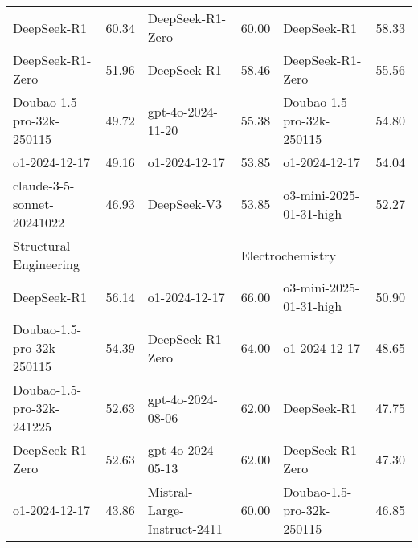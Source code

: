 {\begin{longtable}{p{4.2cm}>{\centering\arraybackslash} p{0.8cm}|p{4.2cm} >{\centering\arraybackslash} p{0.8cm}|p{4.2cm} >{\centering\arraybackslash} p{0.8cm}}
\hline
\cellcolor{blue!5} DeepSeek-R1 & \cellcolor{blue!2}60.34 & \cellcolor{red!5} DeepSeek-R1-Zero & \cellcolor{red!2} 60.00 & \cellcolor{green!5} DeepSeek-R1 & \cellcolor{green!2} 58.33\\
\cellcolor{blue!5} DeepSeek-R1-Zero & \cellcolor{blue!2}51.96 & \cellcolor{red!5} DeepSeek-R1 & \cellcolor{red!2} 58.46 & \cellcolor{green!5} DeepSeek-R1-Zero & \cellcolor{green!2} 55.56\\
\cellcolor{blue!5} Doubao-1.5-pro-32k-250115 & \cellcolor{blue!2}49.72 & \cellcolor{red!5} gpt-4o-2024-11-20 & \cellcolor{red!2} 55.38 & \cellcolor{green!5} Doubao-1.5-pro-32k-250115 & \cellcolor{green!2} 54.80\\
\cellcolor{blue!5} o1-2024-12-17 & \cellcolor{blue!2}49.16 & \cellcolor{red!5} o1-2024-12-17 & \cellcolor{red!2} 53.85 & \cellcolor{green!5} o1-2024-12-17 & \cellcolor{green!2} 54.04\\
\cellcolor{blue!5} claude-3-5-sonnet-20241022 & \cellcolor{blue!2}46.93 & \cellcolor{red!5} DeepSeek-V3 & \cellcolor{red!2} 53.85 & \cellcolor{green!5} o3-mini-2025-01-31-high & \cellcolor{green!2} 52.27\\
\hline
\multicolumn{2}{p{5.15cm}|}{\cellcolor{blue!10} \centering Structural Engineering} & \multicolumn{2}{p{5.15cm}|}{\cellcolor{purple!10} \centering Broadcasting and Television Art} & \multicolumn{2}{p{5.15cm}}{\cellcolor{green!10} \centering Electrochemistry}\\
\hline
\cellcolor{blue!5} DeepSeek-R1 & \cellcolor{blue!2}56.14 & \cellcolor{purple!5} o1-2024-12-17 & \cellcolor{purple!2} 66.00 & \cellcolor{green!5} o3-mini-2025-01-31-high & \cellcolor{green!2} 50.90\\
\cellcolor{blue!5} Doubao-1.5-pro-32k-250115 & \cellcolor{blue!2}54.39 & \cellcolor{purple!5} DeepSeek-R1-Zero & \cellcolor{purple!2} 64.00 & \cellcolor{green!5} o1-2024-12-17 & \cellcolor{green!2} 48.65\\
\cellcolor{blue!5} Doubao-1.5-pro-32k-241225 & \cellcolor{blue!2}52.63 & \cellcolor{purple!5} gpt-4o-2024-08-06 & \cellcolor{purple!2} 62.00 & \cellcolor{green!5} DeepSeek-R1 & \cellcolor{green!2} 47.75\\
\cellcolor{blue!5} DeepSeek-R1-Zero & \cellcolor{blue!2}52.63 & \cellcolor{purple!5} gpt-4o-2024-05-13 & \cellcolor{purple!2} 62.00 & \cellcolor{green!5} DeepSeek-R1-Zero & \cellcolor{green!2} 47.30\\
\cellcolor{blue!5} o1-2024-12-17 & \cellcolor{blue!2}43.86 & \cellcolor{purple!5} Mistral-Large-Instruct-2411 & \cellcolor{purple!2} 60.00 & \cellcolor{green!5} Doubao-1.5-pro-32k-250115 & \cellcolor{green!2} 46.85\\

\end{longtable}}
